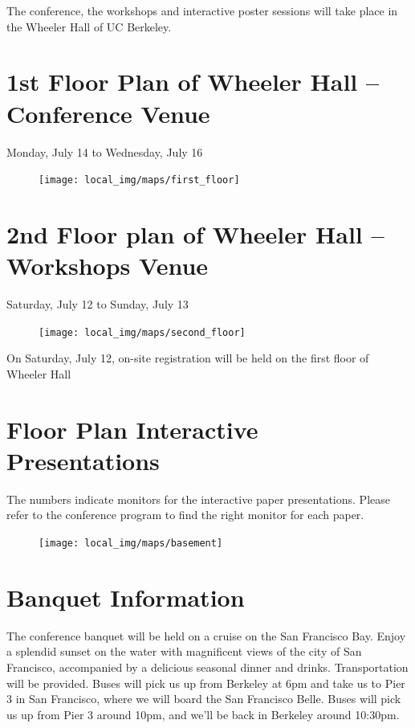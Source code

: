 The conference, the workshops and interactive poster sessions will take place in the Wheeler Hall of UC Berkeley. 

\newpage
{} \section{1st Floor Plan of Wheeler Hall -- Conference Venue}
{\large Monday, July 14 to Wednesday, July 16}
\begin{figure}[h!]
\center
\texttt{[image: local\_img/maps/first\_floor]}
\end{figure}

\newpage
{} \section{2nd Floor plan of Wheeler Hall -- Workshops Venue}
{\large Saturday, July 12 to Sunday, July 13}

\begin{figure}[h!]
\center
\texttt{[image: local\_img/maps/second\_floor]}
\end{figure}

\vspace{1.0cm}
{On Saturday, July 12, on-site registration will be held on the first floor of Wheeler Hall}

\clearpage

 \section{Floor Plan Interactive Presentations}

The numbers indicate monitors for the interactive paper presentations. Please refer to the conference program to find the right monitor for each paper.
\begin{figure}[h!]
\center
\texttt{[image: local\_img/maps/basement]}
\end{figure}



 \section{Banquet Information}
The conference banquet will be held on a cruise on the San Francisco Bay. Enjoy a splendid sunset on the water with magnificent views of the city of San Francisco, accompanied by a
delicious seasonal dinner and drinks. Transportation will be provided. Buses will pick us up from Berkeley at 6pm and take us to Pier 3 in San Francisco, where we will board the San Francisco Belle. Buses will pick us up from Pier 3 around 10pm, and we'll be back in Berkeley
around 10:30pm.

